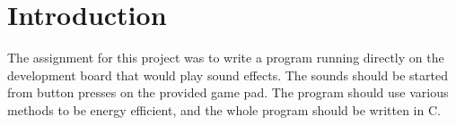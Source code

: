 \section{Introduction}
The assignment for this project was to write a program running directly on the development board that would play sound effects.
The sounds should be started from button presses on the provided game pad.
The program should use various methods to be energy efficient, and the whole program should be written in C.
